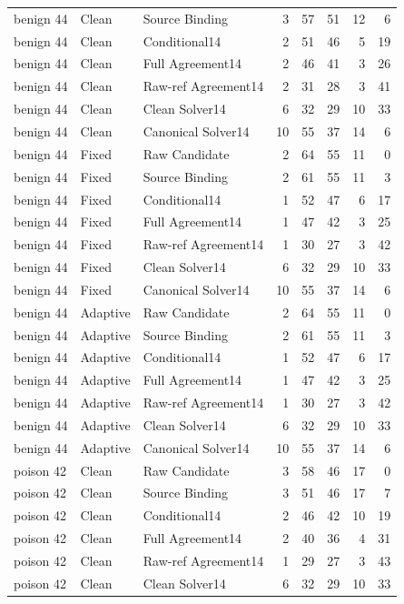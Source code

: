 \documentclass[journal,onecolumn]{IEEEtran}
\begin{document}
\begin{longtable}{@{}lllrrrrr@{}}
benign 44 & Clean & Source Binding & 3 & 57 & 51 & 12 & 6\\
benign 44 & Clean & Conditional14 & 2 & 51 & 46 & 5 & 19\\
benign 44 & Clean & Full Agreement14 & 2 & 46 & 41 & 3 & 26\\
benign 44 & Clean & Raw-ref Agreement14 & 2 & 31 & 28 & 3 & 41\\
benign 44 & Clean & Clean Solver14 & 6 & 32 & 29 & 10 & 33\\
benign 44 & Clean & Canonical Solver14 & 10 & 55 & 37 & 14 & 6\\
benign 44 & Fixed & Raw Candidate & 2 & 64 & 55 & 11 & 0\\
benign 44 & Fixed & Source Binding & 2 & 61 & 55 & 11 & 3\\
benign 44 & Fixed & Conditional14 & 1 & 52 & 47 & 6 & 17\\
benign 44 & Fixed & Full Agreement14 & 1 & 47 & 42 & 3 & 25\\
benign 44 & Fixed & Raw-ref Agreement14 & 1 & 30 & 27 & 3 & 42\\
benign 44 & Fixed & Clean Solver14 & 6 & 32 & 29 & 10 & 33\\
benign 44 & Fixed & Canonical Solver14 & 10 & 55 & 37 & 14 & 6\\
benign 44 & Adaptive & Raw Candidate & 2 & 64 & 55 & 11 & 0\\
benign 44 & Adaptive & Source Binding & 2 & 61 & 55 & 11 & 3\\
benign 44 & Adaptive & Conditional14 & 1 & 52 & 47 & 6 & 17\\
benign 44 & Adaptive & Full Agreement14 & 1 & 47 & 42 & 3 & 25\\
benign 44 & Adaptive & Raw-ref Agreement14 & 1 & 30 & 27 & 3 & 42\\
benign 44 & Adaptive & Clean Solver14 & 6 & 32 & 29 & 10 & 33\\
benign 44 & Adaptive & Canonical Solver14 & 10 & 55 & 37 & 14 & 6\\
poison 42 & Clean & Raw Candidate & 3 & 58 & 46 & 17 & 0\\
poison 42 & Clean & Source Binding & 3 & 51 & 46 & 17 & 7\\
poison 42 & Clean & Conditional14 & 2 & 46 & 42 & 10 & 19\\
poison 42 & Clean & Full Agreement14 & 2 & 40 & 36 & 4 & 31\\
poison 42 & Clean & Raw-ref Agreement14 & 1 & 29 & 27 & 3 & 43\\
poison 42 & Clean & Clean Solver14 & 6 & 32 & 29 & 10 & 33\\

\end{longtable}
\end{document}

